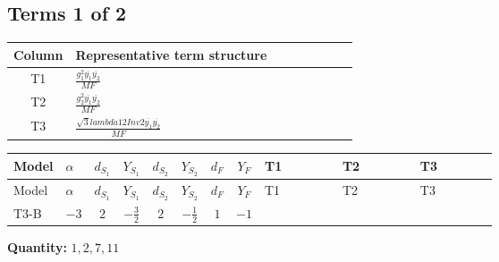 \documentclass[8pt]{article}
\begin{document}
\begin{landscape}
\subsection*{Terms 1 of 2}
\begin{center}
\begin{tabular}{@{}c >{\raggedright\arraybackslash}p{0.82\linewidth}@{}}
\toprule
Column & Representative term structure \\
\midrule
T1 & \(\displaystyle \frac{g_{1}^{2} \overline{y_{1}} \overline{y_{2}}}{MF}\) \\
\midrule
T2 & \(\displaystyle \frac{g_{2}^{2} \overline{y_{1}} \overline{y_{2}}}{MF}\) \\
\midrule
T3 & \(\displaystyle \frac{\sqrt{3} lambda12Inv2 \overline{y_{1}} \overline{y_{2}}}{MF}\) \\
\midrule
\bottomrule
\end{tabular}
\end{center}
\smallskip
\tiny
\begin{longtable}{@{}llcccccc >{\raggedright\arraybackslash}p{0.21\linewidth} >{\raggedright\arraybackslash}p{0.21\linewidth} >{\raggedright\arraybackslash}p{0.21\linewidth}@{}}
\toprule
Model & $\alpha$ & $d_{S_1}$ & $Y_{S_1}$ & $d_{S_2}$ & $Y_{S_2}$ & $d_F$ & $Y_F$ & T1 & T2 & T3 \\
\midrule
\endfirsthead
\toprule
Model & $\alpha$ & $d_{S_1}$ & $Y_{S_1}$ & $d_{S_2}$ & $Y_{S_2}$ & $d_F$ & $Y_F$ & T1 & T2 & T3 \\
\midrule
\endhead
T3-B & $-3$ & $2$ & $-\frac{3}{2}$ & $2$ & $-\frac{1}{2}$ & $1$ & $-1$ & \scriptsize\adjustbox{max width=\linewidth}{$\begin{gathered} - \frac{3 g_{1}^{2} \overline{y_{1}} \overline{y_{2}}}{4 MF}\end{gathered}$} & \scriptsize\adjustbox{max width=\linewidth}{$\begin{gathered} - \frac{3 g_{2}^{2} \overline{y_{1}} \overline{y_{2}}}{8 MF}\end{gathered}$} & \scriptsize\adjustbox{max width=\linewidth}{$\begin{gathered} - \frac{\sqrt{3} lambda12Inv2 \overline{y_{1}} \overline{y_{2}}}{6 MF}\end{gathered}$} \\
\midrule
\bottomrule
\end{longtable}
\clearpage
\noindent\textbf{Quantity: }$\mathrm{1,2,7,11}$\par\smallskip

\end{landscape}
\end{document}
